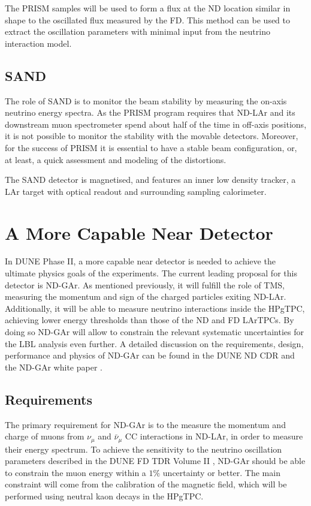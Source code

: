 The PRISM samples will be used to form a flux at the ND location similar in shape to the oscillated flux measured by the FD. This method can be used to extract the oscillation parameters with minimal input from the neutrino interaction model.

\subsection{SAND}

The role of SAND is to monitor the beam stability by measuring the on-axis neutrino energy spectra. As the PRISM program requires that ND-LAr and its downstream muon spectrometer spend about half of the time in off-axis positions, it is not possible to monitor the stability with the movable detectors. Moreover, for the success of PRISM it is essential to have a stable beam configuration, or, at least, a quick assessment and modeling of the distortions.

The SAND detector is magnetised, and features an inner low density tracker, a LAr target with optical readout and surrounding sampling calorimeter.

\section{A More Capable Near Detector}

In DUNE Phase II, a more capable near detector is needed to achieve the ultimate physics goals of the experiments. The current leading proposal for this detector is ND-GAr. As mentioned previously, it will fulfill the role of TMS, measuring the momentum and sign of the charged particles exiting ND-LAr. Additionally, it will be able to measure neutrino interactions inside the HPgTPC, achieving lower energy thresholds than those of the ND and FD LArTPCs. By doing so ND-GAr will allow to constrain the relevant systematic uncertainties for the LBL analysis even further. A detailed discussion on the requirements, design, performance and physics of ND-GAr can be found in the DUNE ND CDR \cite{DUNE2021NDCDR} and the ND-GAr white paper \cite{DUNE2022GArWhite}.

\subsection{Requirements}

The primary requirement for ND-GAr is to the measure the momentum and charge of muons from $\nu_{\mu}$ and $\bar{\nu}_{\mu}$ CC interactions in ND-LAr, in order to measure their energy spectrum. To achieve the sensitivity to the neutrino oscillation parameters described in the DUNE FD TDR Volume II \cite{DUNE2020TDR2}, ND-GAr should be able to constrain the muon energy within a $1\%$ uncertainty or better. The main constraint will come from the calibration of the magnetic field, which will be performed using neutral kaon decays in the HPgTPC.

